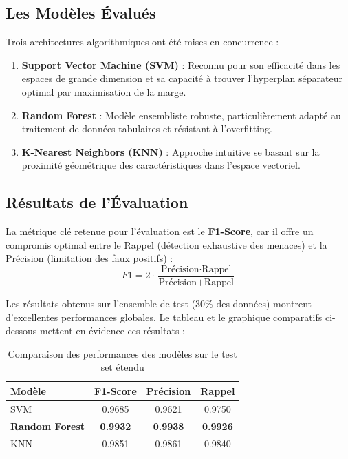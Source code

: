 \documentclass[12pt,a4paper]{article}
\begin{document}
\subsection{Les Modèles Évalués}
Trois architectures algorithmiques ont été mises en concurrence :
\begin{enumerate}
    \item \textbf{Support Vector Machine (SVM)} : Reconnu pour son efficacité dans les espaces de grande dimension et sa capacité à trouver l'hyperplan séparateur optimal par maximisation de la marge.
    \item \textbf{Random Forest} : Modèle ensembliste robuste, particulièrement adapté au traitement de données tabulaires et résistant à l'overfitting.
    \item \textbf{K-Nearest Neighbors (KNN)} : Approche intuitive se basant sur la proximité géométrique des caractéristiques dans l'espace vectoriel.
\end{enumerate}

\subsection{Résultats de l'Évaluation}
La métrique clé retenue pour l'évaluation est le \textbf{F1-Score}, car il offre un compromis optimal entre le Rappel (détection exhaustive des menaces) et la Précision (limitation des faux positifs) :
\[ F1 = 2 \cdot \frac{\text{Précision} \cdot \text{Rappel}}{\text{Précision} + \text{Rappel}} \]

Les résultats obtenus sur l'ensemble de test (30\% des données) montrent d'excellentes performances globales. Le tableau et le graphique comparatifs ci-dessous mettent en évidence ces résultats :

\begin{table}[H]
    \centering
    \renewcommand{\arraystretch}{1.3}
    \begin{tabular}{@{}l|ccc@{}}
    \toprule
    \textbf{Modèle} & \textbf{F1-Score} & \textbf{Précision} & \textbf{Rappel} \\ \midrule
    SVM & 0.9685 & 0.9621 & 0.9750 \\ 
    \textbf{Random Forest} & \textbf{0.9932} & \textbf{0.9938} & \textbf{0.9926} \\ 
    KNN & 0.9851 & 0.9861 & 0.9840 \\ \bottomrule
    \end{tabular}
    \caption{Comparaison des performances des modèles sur le test set étendu}
\end{table}
\end{document}
